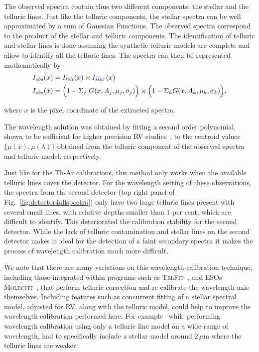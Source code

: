 \documentclass[fleqn,usenatbib]{mnras}
\newcommand*\bl{\color{blue}}
\begin{document}
    The observed spectra contain thus two different components: the stellar and the telluric lines. {\bl Just like the telluric components, the stellar spectra can be well approximated by a sum of Gaussian Functions. The observed spectra correspond to the product of the stellar and telluric components. The identification of telluric and stellar lines is done assuming the synthetic telluric models are complete and allow to identify all the telluric lines. The spectra can then be represented mathematically by} 
    \begin{align}
    I_{obs}(x) &= I_{tell}(x) \times {\bl I_{star}}(x) \nonumber \\
    I_{obs}(x) &= \Big(1 - {\Sigma}_{j}\ G(x, A_{j}, {\mu}_{j}, {\sigma}_{j})\Big) \times \Big(1 - {\Sigma}_{k} G(x, A_{k}, {\mu}_{k}, {\sigma}_{k})\Big), \label{eqn:obs}
    \end{align}
    
    where \(x\) is the pixel coordinate of the extracted spectra.
    
    The wavelength solution was obtained by fitting a second order polynomial, shown to be sufficient for higher precision RV studies~\citep[e.g.][]{bean_groundbased_2010, figueira_radial_2010, seifahrt_synthesising_2010}, to the centroid values \(\{\mu(x), \mu(\lambda)\}\) obtained from the telluric component of the observed spectra and telluric model, respectively.
    
    {\bl Just like for the Th-Ar calibrations, this method only works when the available telluric lines cover the detector.} For the wavelength setting of these observations, the spectra from the second detector (top right panel of Fig.~\ref{fig:detector4allspectra}) only have two large telluric lines present with several small lines, with relative depths smaller than 1 per cent, which are difficult to identify. This deteriorated the calibration stability for the second detector. {\bl While the lack of telluric contamination and stellar lines on the second detector makes it ideal for the detection of a faint secondary spectra it makes the process of wavelength calibration much more difficult.}
    
    We note that there are many variations on this wavelength-calibration technique, including those integrated within programs such as \textsc{TelFit}~\citet{gullikson_correcting_2014}, and ESOs \textsc{Molecfit}~\citet{smette_molecfit_2015}, that perform telluric correction and re-calibrate the wavelength axis themselves. {\bl Including features such as concurrent fitting of a stellar spectral model, adjusted for RV, along with the telluric model, could help to improve the wavelength calibration performed here. For example~\citet{piskorz_evidence_2016} while performing wavelength calibration using only a telluric line model on a wide range of wavelength, had to specifically include a stellar model around 2\,$\mu$m where the telluric lines are weaker.}
    
\end{document}
